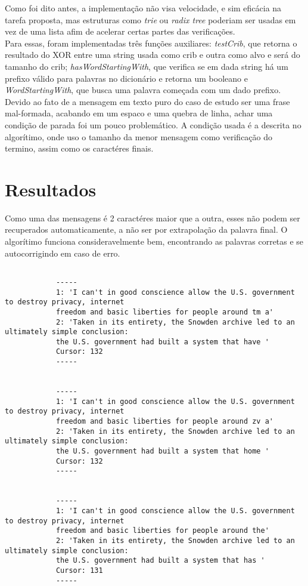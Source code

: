 \documentclass[10pt]{article}
\begin{document}
        Como foi dito antes, a implementação não visa velocidade, e sim eficácia na tarefa proposta, mas estruturas como \textit{trie} ou \textit{radix tree} poderiam ser usadas em vez de uma lista afim de acelerar certas partes das verificações.\\

        Para essas, foram implementadas três funções auxiliares: \textit{testCrib}, que retorna o resultado do XOR entre uma string usada como crib e outra como alvo e será do tamanho do crib; \textit{hasWordStartingWith}, que verifica se em dada string há um prefixo válido para palavras no dicionário e retorna um booleano e \textit{WordStartingWith}, que busca uma palavra começada com um dado prefixo. \\

        Devido ao fato de a mensagem em texto puro do caso de estudo ser uma frase mal-formada, acabando em um espaco e uma quebra de linha, achar uma condição de parada foi um pouco problemático. A condição usada é a descrita no algorítimo, onde uso o tamanho da menor mensagem como verificação do termino, assim como os caractéres finais. 

    \newpage

    \section{Resultados}
    	Como uma das mensagens é 2 caractéres maior que a outra, esses não podem ser recuperados automaticamente, a não ser por extrapolação da palavra final. O algorítimo funciona consideravelmente bem, encontrando as palavras corretas e se autocorrigindo em caso de erro. \\

    	\begin{verbatim}
    		
			-----
			1: 'I can't in good conscience allow the U.S. government to destroy privacy, internet 
			freedom and basic liberties for people around tm a'
			2: 'Taken in its entirety, the Snowden archive led to an ultimately simple conclusion: 
			the U.S. government had built a system that have '
			Cursor: 132
			-----


			-----
			1: 'I can't in good conscience allow the U.S. government to destroy privacy, internet 
			freedom and basic liberties for people around zv a'
			2: 'Taken in its entirety, the Snowden archive led to an ultimately simple conclusion: 
			the U.S. government had built a system that home '
			Cursor: 132
			-----


			-----
			1: 'I can't in good conscience allow the U.S. government to destroy privacy, internet 
			freedom and basic liberties for people around the'
			2: 'Taken in its entirety, the Snowden archive led to an ultimately simple conclusion: 
			the U.S. government had built a system that has '
			Cursor: 131
			-----

    	\end{verbatim}
\end{document}

